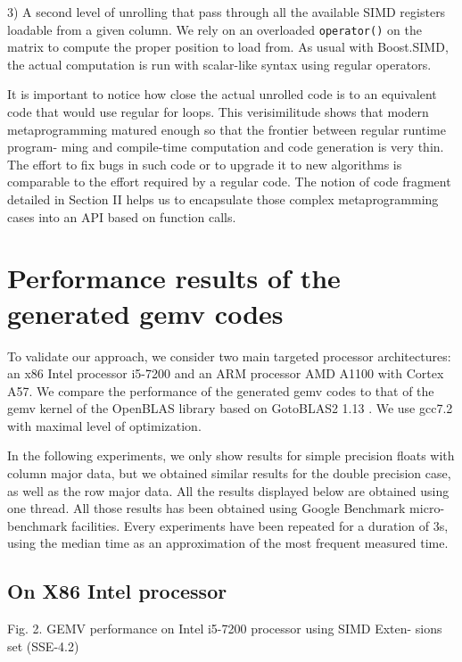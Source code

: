 \documentclass[../../main.tex]{subfiles}
\begin{document}
3) A second level of unrolling that pass through all the
available SIMD registers loadable from a given column.
We rely on an overloaded \lstinline{operator()} on the matrix
to compute the proper position to load from. As usual
with Boost.SIMD, the actual computation is run with
scalar-like syntax using regular operators.

It is important to notice how close the actual unrolled code
is to an equivalent code that would use regular for loops. This
verisimilitude shows that modern metaprogramming matured
enough so that the frontier between regular runtime program-
ming and compile-time computation and code generation is
very thin. The effort to fix bugs in such code or to upgrade
it to new algorithms is comparable to the effort required
by a regular code. The notion of code fragment detailed
in Section II helps us to encapsulate those complex metaprogramming
cases into an API based on function calls.

\section{Performance results of the generated gemv codes}

To validate our approach, we consider two main targeted
processor architectures: an x86 Intel processor i5-7200 and an
ARM processor AMD A1100 with Cortex A57. We compare
the performance of the generated gemv codes to that of the
gemv kernel of the OpenBLAS library based on GotoBLAS2
1.13 \cite{hpcs21}. We use gcc7.2 \cite{hpcs22} with maximal
level of optimization.

In the following experiments, we only show results
for simple precision floats with column major data, but we
obtained similar results for the double precision case, as well
as the row major data. All the results displayed below are
obtained using one thread. All those results has been obtained
using Google Benchmark micro-benchmark facilities. Every
experiments have been repeated for a duration of 3s, using
the median time as an approximation of the most frequent
measured time.

\subsection{On X86 Intel processor}

Fig. 2. GEMV performance on Intel i5-7200 processor using SIMD Exten-
sions set (SSE-4.2)
\end{document}
